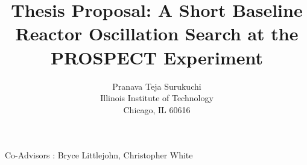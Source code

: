 \documentclass[11pt]{article}
\author{Pranava Teja Surukuchi \\ Illinois Institute of Technology\\ Chicago, IL 60616}
\title{Thesis Proposal: A Short Baseline Reactor \nuebar Oscillation Search at the PROSPECT Experiment}
\date{\displaydate{date}}
\numberwithin{equation}{section}
\begin{document}
\maketitle
\begin{center}

\vspace{120 mm}

Co-Advisors : Bryce Littlejohn, Christopher White
\end{center}
\newpage

\tableofcontents

\newpage
{}
\listoffigures

\listoftables

\newpage
\end{document}
